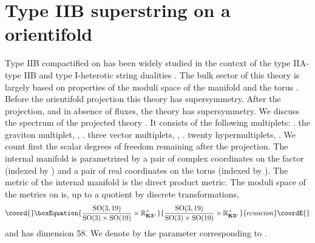 \documentclass[a4paper,12pt]{article}
\begin{document}
\section{Type IIB superstring on a \coordHE{} orientifold}
Type IIB compactified on \coordHE{} has been widely studied
in the context of the  type IIA-type IIB and type I-heterotic
string dualities \cite{ya,fhsv,klm,dlr,as}.
 The bulk sector of this theory is largely based on
properties of the moduli space  \cite{se,cfg} of the \myHighlight{$\K$}\coordHE{} manifold
\cite{as} and the torus \coordHE{}. Before the orientifold projection
this theory has \coordHE{} supersymmetry. After the \coordHE{} projection,
and in absence of fluxes, the theory has \coordHE{} supersymmetry. We
discuss the spectrum of the projected theory \cite{tt}. It
consists of the following multiplets:
\smallskip
{}. the graviton multiplet, \myHighlight{$\quad[ (2), 2(\frac 3 2),
(1)]$}\coordHE{},
\smallskip
{}. three vector multiplets, \myHighlight{$\quad 3\times [ (1),
2(\frac 1 2), 2(0)]$}\coordHE{},
\smallskip
{}. twenty hypermultiplets, \myHighlight{$\quad 20\times [2(\frac 1
2), 4(0)]$}\coordHE{}.
\bigskip
We count first the scalar degrees of freedom remaining after the
projection. The internal manifold is parametrized by a pair of
complex coordinates on the \myHighlight{$\K$}\coordHE{} factor (indexed by \coordHE{}) and a
pair of real coordinates on the torus (indexed by \coordHE{}).  The
metric of the internal manifold is the direct product metric.  The
moduli space of the metrics on \myHighlight{$\K$}\coordHE{} is, up to a quotient by
discrete transformations,
\begin{equation}\coord{}\boxEquation{\frac{\rSO(3,19)}{\rSO(3)\times
\rSO(19)}\times \R^+_\K,\label{k3metrics}}{\frac{\rSO(3,19)}{\rSO(3)\times
\rSO(19)}\times \R^+_\K,}{ecuacion}\coordE{}\end{equation} and has
dimension 58. We denote by \coordHE{} the parameter corresponding to
\myHighlight{$\R^+_\K$}\coordHE{}.
\end{document}
